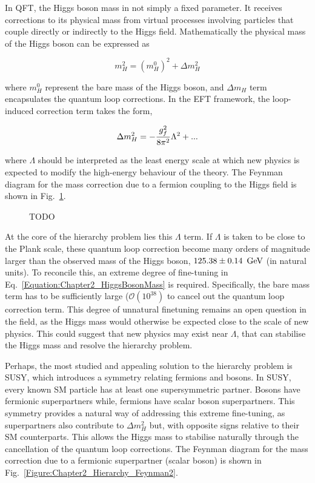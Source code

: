 In QFT, the Higgs boson mass in not simply a fixed parameter. It receives corrections to its physical mass from virtual processes involving particles that couple directly or indirectly to the Higgs field. Mathematically the physical mass of the Higgs boson can be expressed as

\begin{equation}
    m_H^2 = (m_H^0)^2 + \Delta m_H^2
\label{Equation:Chapter2_HiggsBosonMass}
\end{equation}

where $m_H^0$ represent the bare mass of the Higgs boson, and $\Delta m_H$ term encapsulates the quantum loop corrections. In the EFT framework, the loop-induced correction term takes the form,

\begin{equation}
    \Delta m_H^2 = -\frac{g_f^2}{8\pi^2}\Lambda^2 + \space \text{...}
\end{equation}

where $\Lambda$ should be interpreted as the least energy scale at which new physics is expected to modify the high-energy behaviour of the theory. The Feynman diagram for the mass correction due to a fermion coupling to the Higgs field is shown in Fig.~\ref{Figure:Chapter2_Hierarchy_Feynman1}.

\begin{figure}[h]
\centering

\caption{TODO}
\label{Figure:Chapter2_Hierarchy_Feynman1}
\end{figure}

At the core of the hierarchy problem lies this $\Lambda$ term. If $\Lambda$ is taken to be close to the Plank scale, these quantum loop correction become many orders of magnitude larger than the observed mass of the Higgs boson, $125.38 \pm 0.14~\,\text{Ge\hspace{-.08em}V}$ (in natural units). To reconcile this, an extreme degree of fine-tuning in Eq.~\ref{Equation:Chapter2_HiggsBosonMass} is required. Specifically, the bare mass term has to be sufficiently large ($\mathcal{O}(10^{38})$ to cancel out the quantum loop correction term. This degree of unnatural finetuning remains an open question in the field, as the Higgs mass would otherwise be expected close to the scale of new physics. This could suggest that new physics may exist near $\Lambda$, that can stabilise the Higgs mass and resolve the hierarchy problem. 

Perhaps, the most studied and appealing solution to the hierarchy problem is \ac{SUSY}, which introduces a symmetry relating fermions and bosons. In SUSY, every known SM particle has at least one supersymmetric partner. Bosons have fermionic superpartners while, fermions have scalar boson superpartners. This symmetry provides a natural way of addressing this extreme fine-tuning, as superpartners also contribute to $\Delta m_H^2$ but, with opposite signs relative to their SM counterparts. This allows the Higgs mass to stabilise naturally through the cancellation of the quantum loop corrections. The Feynman diagram for the mass correction due to a fermionic superpartner (scalar boson) is shown in Fig.~\ref{Figure:Chapter2_Hierarchy_Feynman2}.

